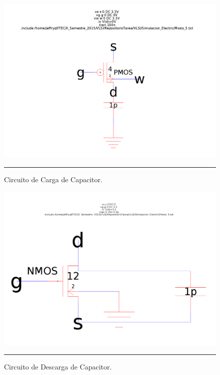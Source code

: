 \documentclass[12pt,a4paper]{article} %
\begin{document}
\begin{figure}[htbp]
  \centering
    \includegraphics[scale=0.3]{./R_PMOS.png}
    \rule{35em}{0.3pt}
  \caption[C_Carga]{Circuito de Carga de Capacitor.}
  \label{fig:R_PMOS}
\end{figure}

\begin{figure}[htbp]
  \centering
  	\includegraphics[scale=0.3]{./R_NMOS.png}
    \rule{35em}{0.3pt}
  \caption[C_Descarga]{Circuito de Descarga de Capacitor.}
  \label{fig:R_NMOS}
\end{figure}
\end{document}
